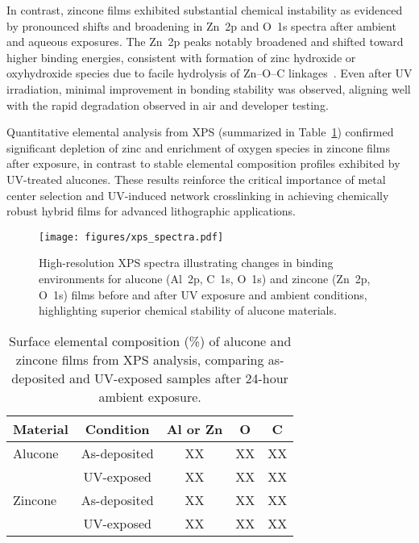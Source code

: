 In contrast, zincone films exhibited substantial chemical instability as evidenced by pronounced shifts and broadening in Zn~2p and O~1s spectra after ambient and aqueous exposures. The Zn~2p peaks notably broadened and shifted toward higher binding energies, consistent with formation of zinc hydroxide or oxyhydroxide species due to facile hydrolysis of Zn--O--C linkages~\cite{REF}. Even after UV irradiation, minimal improvement in bonding stability was observed, aligning well with the rapid degradation observed in air and developer testing.

Quantitative elemental analysis from XPS (summarized in Table~\ref{tab:xps_composition}) confirmed significant depletion of zinc and enrichment of oxygen species in zincone films after exposure, in contrast to stable elemental composition profiles exhibited by UV-treated alucones. These results reinforce the critical importance of metal center selection and UV-induced network crosslinking in achieving chemically robust hybrid films for advanced lithographic applications.

\begin{figure}[ht]
  \centering
  \texttt{[image: figures/xps\_spectra.pdf]}
  \caption{High-resolution XPS spectra illustrating changes in binding environments for alucone (Al~2p, C~1s, O~1s) and zincone (Zn~2p, O~1s) films before and after UV exposure and ambient conditions, highlighting superior chemical stability of alucone materials.}
  \label{fig:xps_spectra}
\end{figure}

\begin{table}[ht]
  \centering
  \caption{Surface elemental composition (\%) of alucone and zincone films from XPS analysis, comparing as-deposited and UV-exposed samples after 24-hour ambient exposure.}
  \label{tab:xps_composition}
  \begin{tabular}{lcccc}
    \toprule
    Material & Condition & Al or Zn & O & C \\
    \midrule
    Alucone & As-deposited & XX & XX & XX \\
            & UV-exposed & XX & XX & XX \\[1ex]
    Zincone & As-deposited & XX & XX & XX \\
            & UV-exposed & XX & XX & XX \\
    \bottomrule
  \end{tabular}
\end{table}




